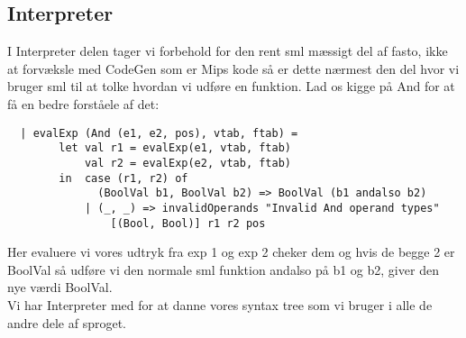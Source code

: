 \documentclass[a4paper]{article}
\begin{document}
\subsection{Interpreter}
I Interpreter delen tager vi forbehold for den rent sml mæssigt del af fasto, ikke at forvæksle med CodeGen som er Mips kode så er dette nærmest den del hvor vi bruger sml til at tolke hvordan vi udføre en funktion. Lad os kigge på And for at få en bedre forståele af det:
\begin{lstlisting}
  | evalExp (And (e1, e2, pos), vtab, ftab) =
        let val r1 = evalExp(e1, vtab, ftab)
            val r2 = evalExp(e2, vtab, ftab)
        in  case (r1, r2) of
              (BoolVal b1, BoolVal b2) => BoolVal (b1 andalso b2)
            | (_, _) => invalidOperands "Invalid And operand types" 
            	[(Bool, Bool)] r1 r2 pos
\end{lstlisting}
Her evaluere vi vores udtryk fra exp 1 og exp 2 cheker dem og hvis de begge 2 er BoolVal så udføre vi den normale sml funktion andalso på b1 og b2, giver den nye værdi BoolVal.\\
Vi har Interpreter med for at danne vores syntax tree som vi bruger i alle de andre dele af sproget.
\end{document}
